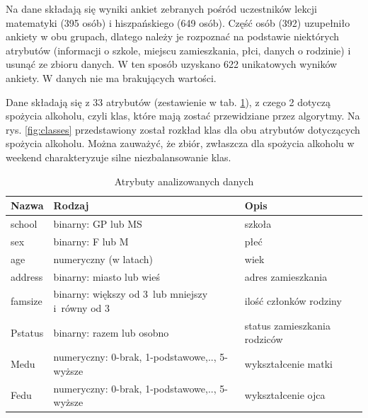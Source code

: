 Na dane składają się wyniki ankiet zebranych pośród uczestników lekcji matematyki (395 osób) i hiszpańskiego (649 osób). Część osób (392) uzupełniło ankiety w obu grupach, dlatego należy je rozpoznać na podstawie niektórych atrybutów (informacji o szkole, miejscu zamieszkania, płci, danych o rodzinie) i usunąć ze zbioru danych. W ten sposób uzyskano 622 unikatowych wyników ankiety. W danych nie ma brakujących wartości.

Dane składają się z 33 atrybutów (zestawienie w tab. \ref{tab:attributes}), z czego 2 dotyczą spożycia alkoholu, czyli klas, które mają zostać przewidziane przez algorytmy. Na rys. \ref{fig:classes} przedstawiony został rozkład klas dla obu atrybutów dotyczących spożycia alkoholu. Można zauważyć, że zbiór, zwłaszcza dla spożycia alkoholu w weekend charakteryzuje silne niezbalansowanie klas.
\begin{table}[h!]
\centering
\caption{Atrybuty analizowanych danych}
\label{tab:attributes}
\begin{tabular}{|p{1.4cm}|p{3cm}|p{3cm}|}
\hline
Nazwa & Rodzaj & Opis \\ \hline
school   &     binarny: GP lub MS &   szkoła \\ \hline
sex   &   binarny: F lub M   &   płeć \\ \hline
age   &   numeryczny (w latach)   &  wiek  \\ \hline
address   &   binarny: miasto lub wieś   &  adres zamieszkania  \\ \hline
famsize   &  binarny: większy od 3\ lub mniejszy i~równy od 3     &  ilość członków rodziny  \\ \hline
Pstatus   &  binarny: razem lub osobno    &  status zamieszkania rodziców  \\ \hline

Medu   &  numeryczny: 0-brak, 1-podstawowe,.., 5-wyższe    &   wykształcenie matki \\ \hline
Fedu   &     numeryczny: 0-brak, 1-podstawowe,.., 5-wyższe &  wykształcenie ojca  \\ \hline
\end{tabular}
\end{table}

